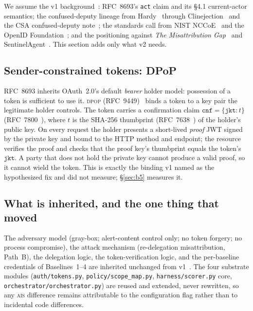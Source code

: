 \documentclass[11pt]{article}
\newcommand{\ais}{\textsc{ais}}
\newcommand{\code}[1]{\texttt{#1}}
\newcommand{\cnf}{\code{cnf}}
\newcommand{\jkt}{\code{jkt}}
\newcommand{\dpop}{\textsc{dpop}}
\begin{document}
We assume the v1 background~\cite{aegisv1}: RFC~8693's \code{act} claim and
its \S4.1 current-actor semantics; the confused-deputy lineage from
Hardy~\cite{hardy1988} through Clinejection~\cite{clinejection} and the CSA
confused-deputy note~\cite{csa2026}; the standards call from NIST
NCCoE~\cite{nist2026} and the OpenID Foundation~\cite{openid2026}; and the
positioning against \emph{The Misattribution Gap}~\cite{misattribution} and
SentinelAgent~\cite{sentinelagent}. This section adds only what v2 needs.

\subsection{Sender-constrained tokens: DPoP}
RFC~8693 inherits OAuth~2.0's default \emph{bearer} holder model: possession
of a token is sufficient to use it. \dpop{} (RFC~9449)~\cite{rfc9449} binds a
token to a key pair the legitimate holder controls. The token carries a
confirmation claim $\cnf = \{\jkt: t\}$ (RFC~7800~\cite{rfc7800}), where $t$
is the SHA-256 thumbprint (RFC~7638~\cite{rfc7638}) of the holder's public
key. On every request the holder presents a short-lived \emph{proof} JWT
signed by the private key and bound to the HTTP method and endpoint; the
resource verifies the proof and checks that the proof key's thumbprint
equals the token's $\jkt$. A party that does not hold the private key cannot
produce a valid proof, so it cannot wield the token. This is exactly the
binding v1 named as the hypothesized fix and did not measure; \S\ref{sec:b5}
measures it.

\subsection{What is inherited, and the one thing that moved}
The adversary model (gray-box; alert-content control only; no token forgery;
no process compromise), the attack mechanism (re-delegation misattribution,
Path~B), the delegation logic, the token-verification logic, and the
per-baseline credentials of Baselines~1--4 are inherited unchanged from
v1~\cite{aegisv1}. The four substrate modules (\code{auth/tokens.py},
\code{policy/scope\_map.py}, \code{harness/scorer.py} core,
\code{orchestrator/orchestrator.py}) are reused and extended, never rewritten,
so any \ais{} difference remains attributable to the configuration flag rather
than to incidental code differences.
\end{document}
